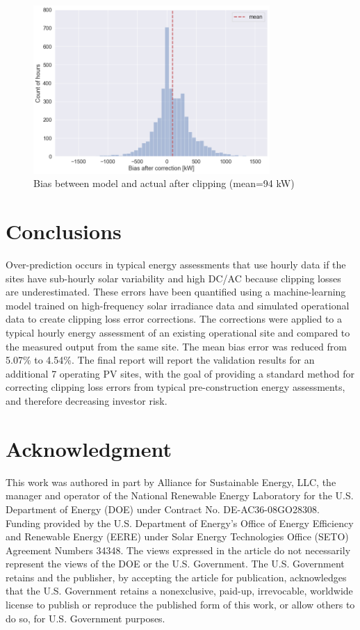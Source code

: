 \documentclass[conference]{IEEEtran}
\begin{document}
\begin{figure}[htbp]
\centerline{\includegraphics[width=9cm]{Error_after_correction_3.png}}
\caption{Bias between model and actual after clipping (mean=94 kW)}
\label{fig:after-clipping-error}
\end{figure}


\section{Conclusions}
Over-prediction occurs in typical energy assessments that use hourly data if the sites have sub-hourly solar variability and high DC/AC because clipping losses are underestimated. These errors have been quantified using a machine-learning model trained on high-frequency solar irradiance data and simulated operational data to create clipping loss error corrections. The corrections were applied to a typical hourly energy assessment of an existing operational site and compared to the measured output from the same site. The mean bias error was reduced from 5.07\% to 4.54\%. The final report will report the validation results for an additional 7 operating PV sites, with the goal of providing a standard method for correcting clipping loss errors from typical pre-construction energy assessments, and therefore decreasing investor risk.

\section*{Acknowledgment}

This work was authored in part by Alliance for Sustainable Energy, LLC, the manager and operator of the National Renewable Energy Laboratory for the U.S. Department of Energy (DOE) under Contract No. DE-AC36-08GO28308. Funding provided by the U.S. Department of Energy’s Office of Energy Efficiency and Renewable Energy (EERE) under Solar Energy Technologies Office (SETO) Agreement Numbers 34348. The views expressed in the article do not necessarily represent the views of the DOE or the U.S. Government. The U.S. Government retains and the publisher, by accepting the article for publication, acknowledges that the U.S. Government retains a nonexclusive, paid-up, irrevocable, worldwide license to publish or reproduce the published form of this work, or allow others to do so, for U.S. Government purposes.



\end{document}
